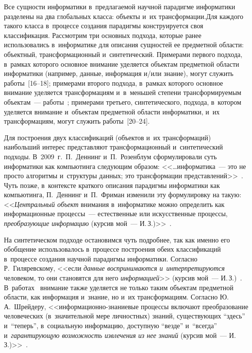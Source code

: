 \begin{multicols}{2}
  Все сущности информатики в~предлагаемой научной парадигме 
информатики разделены на два глобальных класса: объекты и~их 
трансформации.\linebreak Для каждого такого клас\-са в~процессе создания па\-ра\-диг\-мы 
конструируется своя классификация. Рас\-смот\-рим три основных подхода, 
которые ранее использовались в~информатике для описания \mbox{сущностей} ее 
предметной об\-ласти: объектный, трансформационный и~синтетический. 
Примерами первого подхода, в~рамках которого основное внимание уделяется 
объектам предметной об\-ласти информатики (например, данные, информация 
и/или знание), могут служить работы~[16--18]; примерами второго подхода, 
в~рамках которого основное внимание уделяется трансформациям и~в~меньшей 
степени трансформируемым объектам~--- работы~\cite{6-zac, 19-zac}; 
примерами треть\-его, синтетического, подхода, в~котором уделяется внимание 
и~объектам предметной об\-ласти информатики, и~их трансформациям, могут 
служить работы~[20--24].
  
  Для построения двух классификаций (объектов и~их трансформаций) 
наибольший интерес пред\-став\-ля\-ют трансформационный и~синтетический 
подходы. В~2009~г.\ П.~Деннинг и~П.~Розенблум сформулировали суть 
информатики как компьютинга следующим образом: <<\ldots информатика~--- 
это не просто алгоритмы и~структуры данных; это трансформации 
представлений>>~\cite{6-zac}. Чуть позже, в~контексте краткого описания 
парадигмы информатики как компьютинга, П.~Деннинг и~П.~Фриман изменили 
эту формулировку на такую: <<\textit{Центральный объект} внимания 
в~информатике можно определить как информационные процессы~--- 
естественные или искусственные процессы, \textit{преобразующие 
информацию} (курсив мой~--- И.\,З.)>>~\cite{19-zac}.
  
  На синтетическом подходе остановимся чуть подроб\-нее, так как именно его 
обобщение использовалось в~процессе построения обеих классификаций 
в~процессе создания научной парадигмы информатики. Согласно 
Р.~Гиляревскому, <<если \textit{данные воспринимаются и~интерпретируются} человеком, то они становятся для него 
\textit{информацией}>> (курсив мой~--- И.\,З.)~\cite[с.~10]{20-zac}. 
В~работах~\cite{21-zac, 22-zac, 23-zac, 24-zac} внимание также уделяется не 
только таким объектам предметной области, как информация и~знание, но и~их 
трансформациям. Согласно Ю.\,А.~Шрейдеру,  
<<ин\-фор\-ма\-ци\-он\-но-зна\-ни\-евые процессы включают преобразование 
человеческих (в~значительной мере личностных) знаний, существующих 
``здесь'' и~``теперь'', в~социальную информацию, доступную ``везде'' и~``всегда'' 
и~\textit{гарантирующую возможность извлечения из нее знаний} (курсив 
мой~--- И.\,З.)>>~\cite{21-zac}.


\end{multicols}
